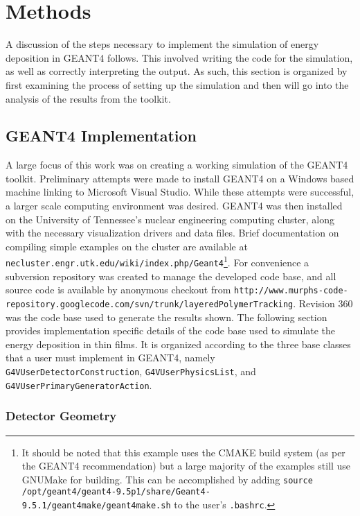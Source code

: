 \section{Methods}
\label{sec:Methods}

A discussion of the steps necessary to implement the simulation of energy deposition in GEANT4 follows.
This involved writing the code for the simulation, as well as correctly interpreting the output.
As such, this section is organized by first examining the process of setting up the simulation and then will go into the analysis of the results from the toolkit.
\subsection{GEANT4 Implementation}

A large focus of this work was on creating a working simulation of the GEANT4 toolkit.
Preliminary attempts were made to install GEANT4 on a Windows based machine linking to Microsoft Visual Studio. While these attempts were successful, a larger scale computing environment was desired.
GEANT4 was then installed on the University of Tennessee's nuclear engineering computing cluster, along with the necessary visualization drivers and data files.
Brief documentation on compiling simple examples on the cluster are available at \texttt{necluster.engr.utk.edu/wiki/index.php/Geant4}\footnote{It should be noted that this example uses the CMAKE build system (as per the GEANT4 recommendation) but a large majority of the examples still use GNUMake for building. This can be accomplished by adding \verb+source /opt/geant4/geant4-9.5p1/share/Geant4-9.5.1/geant4make/geant4make.sh+ to the user's \verb+.bashrc+.}. 
For convenience a subversion repository was created to manage the developed code base, and all source code is available by anonymous checkout from \texttt{http://www.murphs-code-repository.googlecode.com/svn/trunk/layeredPolymerTracking}. Revision 360 was the code base used to generate the results shown.
The following section provides implementation specific details of the code base used to simulate the energy deposition in thin films.
It is organized according to the three base classes that a user must implement in GEANT4, namely \verb+G4VUserDetectorConstruction+, \verb+G4VUserPhysicsList+, and \verb+G4VUserPrimaryGeneratorAction+.
\subsubsection{Detector Geometry}

